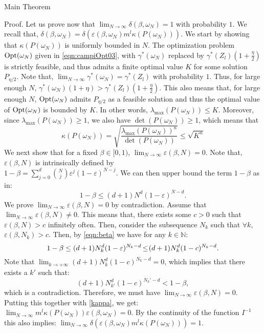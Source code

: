 \begin{subsection}{Main Theorem}
\begin{pf*}{Proof.}
Let us prove now that $\lim_{N \to \infty} \delta(\beta, \omega_N) = 1$ with probability $1$. We recall that, $\delta(\beta, \omega_N) = \delta \left( \varepsilon(\beta, \omega_N) m^l \kappa(P(\omega_N)) \right)$. We start by showing that $\kappa \left( P(\omega_N) \right)$  is uniformly bounded in $N$. The optimization problem $\text{Opt}(\omega_N)$ given in \eqref{eqn:campiOpt03}, with $\gamma^{*}(\omega_N)$ replaced by $\gamma^{*}(Z_l)(1+\frac{\eta}{2})$ is strictly feasible, and thus admits a finite optimal value $K$ for some solution $P_{\eta/2}$. Note that, $\lim_{N \to \infty} \gamma^{*}(\omega_N)= \gamma^{*}(Z_l)$ with probability $1$. Thus, for large enough $N$, \mbox{$\gamma^{*}(\omega_N)(1+\eta) > \gamma^{*}(Z_l)(1+\frac{\eta}{2})$.} This also means that, for large enough $N$, $\text{Opt}(\omega_N)$ admits $P_{\eta/2}$ as a feasible solution and thus the optimal value of $\text{Opt}(\omega_N)$ is bounded by $K.$ In other words, \mbox{$\lambda_{\max}(P({\omega_N})) \leq K$.} Moreover, since  
$\lambda_{\max}(P(\omega_N))\geq 1$, we also have \mbox{$\det(P(\omega_N)) \geq 1$,} which means that
\begin{equation}\label{kappa}
\kappa \left( P(\omega_N) \right) = \sqrt{\frac{\lambda_{\max}(P(\omega_N))^n}{\det(P(\omega_N))}} \leq \sqrt{K^n}
\end{equation}
We next show that for a fixed $\beta \in [0,1)$, $\lim_{N \to \infty} \varepsilon(\beta, N) = 0$. Note that, $\varepsilon(\beta, N)$ is intrinsically defined by \\
$1-\beta = \sum_{j=0}^d {{N}\choose{j}} \varepsilon^j (1-\varepsilon)^{N-j}$. We can then upper bound the term $1-\beta$ as in:
\begin{equation}\label{eqn:beta}
1-\beta \leq  (d+1)N^d (1-\varepsilon)^{N-d}.
\end{equation}
We prove $\lim_{N \to \infty} \varepsilon(\beta, N) = 0$ by contradiction. Assume that $\lim_{N \to \infty} \varepsilon(\beta, N) \not= 0$. This means that, there exists some $c > 0$ such that $\varepsilon(\beta, N) > c$ infinitely often. Then, consider the subsequence $N_k$ such that $\forall k$, $\varepsilon(\beta, N_k) > c$. Then, by \eqref{eqn:beta} we have for any $k \in \mathbb{N}$:
\begin{equation*}
1-\beta \leq  (d+1)N_k^d (1-\varepsilon)^{N_k-d}\hspace{-0.4mm} \leq \hspace{-0.7mm}(d+1)N_k^d (1-c)^{N_k-d}. 
\end{equation*}
Note that $\lim_{k \to +\infty}(d+1)N_k^d (1-c)^{N_k-d} = 0$, which implies that there exists a $k'$ such that:
$$(d+1)N_{k'}^d (1-c)^{N_k'-d} < 1 - \beta,$$ which is a contradiction. Therefore, we must have  $\lim_{N \to \infty} \varepsilon (\beta, N) = 0$. Putting this together with \eqref{kappa}, we get: $\lim_{N \to \infty} m^l \kappa(P(\omega_N)) \varepsilon(\beta, \omega_N) = 0$. By the continuity of the function $I^{-1}$ this also implies: $\lim_{N \to \infty} \delta \left( \varepsilon(\beta, \omega_N) m^l \kappa(P(\omega_N)) \right) = 1.$
\end{pf*}
\end{subsection}